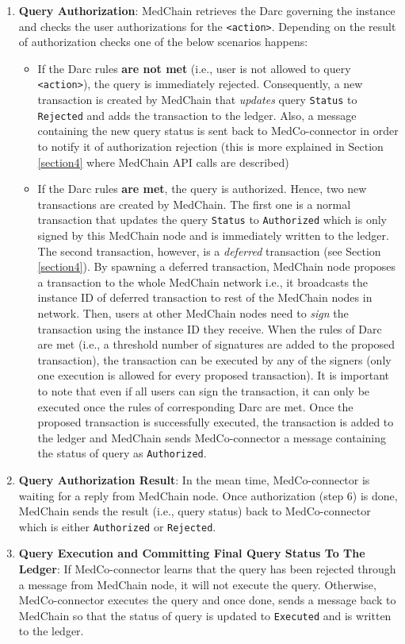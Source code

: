 \begin{enumerate}
    \item \textbf{Query Authorization}: MedChain retrieves the Darc governing the instance and checks the user authorizations for the \texttt{<action>}. Depending on the result of authorization checks one of the below scenarios happens:
    \begin{itemize}
        \item If the Darc rules \textbf{are not met} (i.e., user is not allowed to query \texttt{<action>}), the query is immediately rejected. Consequently, a new transaction is created by MedChain that \textit{updates} query \texttt{Status} to \texttt{Rejected} and adds the transaction to the ledger. Also, a message containing the new query status is sent back to MedCo-connector in order to notify it of authorization rejection (this is more explained in Section \ref{section4} where MedChain API calls are described)
        
        \item If the Darc rules \textbf{are met}, the query is authorized. Hence, two new transactions are created by MedChain. The first one is a normal transaction that updates the query \texttt{Status} to \texttt{Authorized} which is only signed by this MedChain node and is immediately written to the ledger. The second transaction, however, is a \textit{deferred} transaction (see Section \ref{section4}). By spawning a deferred transaction, MedChain node proposes a transaction to the whole MedChain network i.e., it broadcasts the instance ID of deferred transaction to rest of the MedChain nodes in network. Then, users at other MedChain nodes need to \textit{sign} the transaction using the instance ID they receive. When the rules of Darc are met (i.e., a threshold number of signatures are added to the proposed transaction), the transaction can be executed by any of the signers (only one execution is allowed for every proposed transaction). It is important to note that even if all users can sign the transaction, it can only be executed once the rules of corresponding Darc are met. 
        Once the proposed transaction is successfully executed, the transaction is added to the ledger and MedChain sends MedCo-connector a message containing the status of query as \texttt{Authorized}.  
    \end{itemize}
     
    \item \textbf{Query Authorization Result}: In the mean time, MedCo-connector is waiting for a reply from MedChain node. Once authorization (step 6) is done, MedChain sends the result (i.e., query status) back to MedCo-connector which is either \texttt{Authorized} or \texttt{Rejected}. 
    
    \item \textbf{Query Execution and Committing Final Query Status To The Ledger}: If MedCo-connector learns that the query has been rejected through a message from MedChain node, it will not execute the query. Otherwise, MedCo-connector executes the query and once done, sends a message back to MedChain so that the status of query is updated to \texttt{Executed} and is written to the ledger.

\end{enumerate}
 
